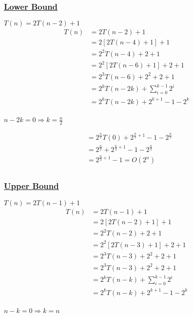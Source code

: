 \newpage


\subsubsection*{\underline{Lower Bound}}
\(T(n) = 2T(n-2) + 1\)\\

\begin{align*}
T(n) &= 2T(n-2) + 1\\
     &= 2[2T(n-4)+1] + 1\\
     &= 2^2T(n-4)+2+ 1\\
     &= 2^2[2T(n-6)+1]+2+1\\
     &= 2^3T(n-6)+2^2+2+1\\
     &= 2^kT(n-2k)+\sum_{i=0}^{k-1} 2^i\\
     &= 2^kT(n-2k)+ 2^{k+1} - 1 - 2^{k}\\
\end{align*}

\(n-2k = 0 \Rightarrow \boxed{k =\frac{n}{2}} \)

\begin{align*}
&= 2^{\frac{n}{2}}T(0)+ 2^{\frac{n}{2}+1} - 1 - 2^{\frac{n}{2}}\\
&= 2^{\frac{n}{2}}+ 2^{\frac{n}{2}+1} - 1 - 2^{\frac{n}{2}}\\
&= 2^{\frac{n}{2}+1} - 1  = O(2^n)\\
\end{align*}

\subsubsection*{\underline{Upper Bound}}
\(T(n) = 2T(n-1) + 1\)\\

\begin{align*}
T(n) &= 2T(n-1) + 1\\
&= 2[2T(n-2)+1] + 1\\
&= 2^2T(n-2)+2 + 1\\
&= 2^2[2T(n-3)+1]+2 + 1\\
&= 2^3T(n-3)+2^2+2 + 1\\
&= 2^3T(n-3)+2^2+2 + 1\\
&= 2^kT(n-k)+\sum_{i=0}^{k-1} 2^i\\
&= 2^kT(n-k)+ 2^{k+1} - 1 - 2^k\\
\end{align*}

\newpage

\(n-k = 0 \Rightarrow \boxed{k = n} \)

